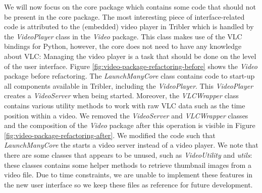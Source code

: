We will now focus on the core package which contains some code that should not be present in the core package. The most interesting piece of interface-related code is attributed to the (embedded) video player in Tribler which is handled by the \emph{VideoPlayer} class in the \emph{Video} package. This class makes use of the VLC bindings for Python, however, the core does not need to have any knowledge about VLC: Managing the video player is a task that should be done on the level of the user interface. Figure \ref{fig:video-package-refactoring-before} shows the \emph{Video} package before refactoring. The \emph{LaunchManyCore} class contains code to start-up all components available in Tribler, including the \emph{VideoPlayer}. This \emph{VideoPlayer} creates a \emph{VideoServer} when being started. Moreover, the \emph{VLCWrapper} class contains various utility methods to work with raw VLC data such as the time position within a video. We removed the \emph{VideoServer} and \emph{VLCWrapper} classes and the composition of the \emph{Video} package after this operation is visible in Figure \ref{fig:video-package-refactoring-after}. We modified the code such that \emph{LaunchManyCore} the starts a video server instead of a video player. We note that there are some classes that appears to be unused, such as \emph{VideoUtility} and \emph{utils}: these classes contains some helper methods to retrieve thumbnail images from a video file. Due to time constraints, we are unable to implement these features in the new user interface so we keep these files as reference for future development.

